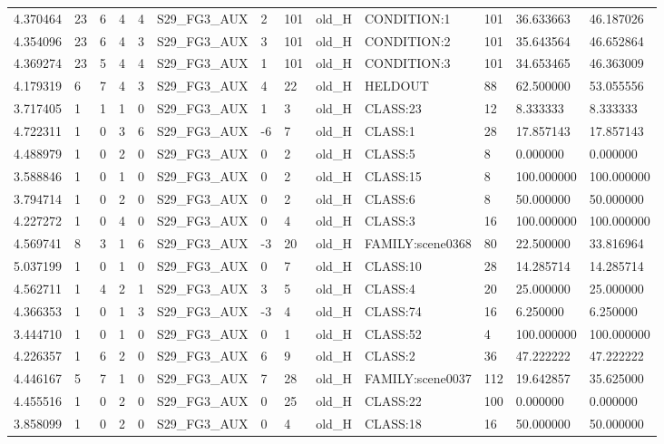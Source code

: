 \begin{tabular}{lllllllllllll}
4.370464 & 23 & 6 & 4 & 4 & S29\_FG3\_AUX & 2 & 101 & old\_H & CONDITION:1 & 101 & 36.633663 & 46.187026 \\
4.354096 & 23 & 6 & 4 & 3 & S29\_FG3\_AUX & 3 & 101 & old\_H & CONDITION:2 & 101 & 35.643564 & 46.652864 \\
4.369274 & 23 & 5 & 4 & 4 & S29\_FG3\_AUX & 1 & 101 & old\_H & CONDITION:3 & 101 & 34.653465 & 46.363009 \\
4.179319 & 6 & 7 & 4 & 3 & S29\_FG3\_AUX & 4 & 22 & old\_H & HELDOUT & 88 & 62.500000 & 53.055556 \\
3.717405 & 1 & 1 & 1 & 0 & S29\_FG3\_AUX & 1 & 3 & old\_H & CLASS:23 & 12 & 8.333333 & 8.333333 \\
4.722311 & 1 & 0 & 3 & 6 & S29\_FG3\_AUX & -6 & 7 & old\_H & CLASS:1 & 28 & 17.857143 & 17.857143 \\
4.488979 & 1 & 0 & 2 & 0 & S29\_FG3\_AUX & 0 & 2 & old\_H & CLASS:5 & 8 & 0.000000 & 0.000000 \\
3.588846 & 1 & 0 & 1 & 0 & S29\_FG3\_AUX & 0 & 2 & old\_H & CLASS:15 & 8 & 100.000000 & 100.000000 \\
3.794714 & 1 & 0 & 2 & 0 & S29\_FG3\_AUX & 0 & 2 & old\_H & CLASS:6 & 8 & 50.000000 & 50.000000 \\
4.227272 & 1 & 0 & 4 & 0 & S29\_FG3\_AUX & 0 & 4 & old\_H & CLASS:3 & 16 & 100.000000 & 100.000000 \\
4.569741 & 8 & 3 & 1 & 6 & S29\_FG3\_AUX & -3 & 20 & old\_H & FAMILY:scene0368 & 80 & 22.500000 & 33.816964 \\
5.037199 & 1 & 0 & 1 & 0 & S29\_FG3\_AUX & 0 & 7 & old\_H & CLASS:10 & 28 & 14.285714 & 14.285714 \\
4.562711 & 1 & 4 & 2 & 1 & S29\_FG3\_AUX & 3 & 5 & old\_H & CLASS:4 & 20 & 25.000000 & 25.000000 \\
4.366353 & 1 & 0 & 1 & 3 & S29\_FG3\_AUX & -3 & 4 & old\_H & CLASS:74 & 16 & 6.250000 & 6.250000 \\
3.444710 & 1 & 0 & 1 & 0 & S29\_FG3\_AUX & 0 & 1 & old\_H & CLASS:52 & 4 & 100.000000 & 100.000000 \\
4.226357 & 1 & 6 & 2 & 0 & S29\_FG3\_AUX & 6 & 9 & old\_H & CLASS:2 & 36 & 47.222222 & 47.222222 \\
4.446167 & 5 & 7 & 1 & 0 & S29\_FG3\_AUX & 7 & 28 & old\_H & FAMILY:scene0037 & 112 & 19.642857 & 35.625000 \\
4.455516 & 1 & 0 & 2 & 0 & S29\_FG3\_AUX & 0 & 25 & old\_H & CLASS:22 & 100 & 0.000000 & 0.000000 \\
3.858099 & 1 & 0 & 2 & 0 & S29\_FG3\_AUX & 0 & 4 & old\_H & CLASS:18 & 16 & 50.000000 & 50.000000 \\

\end{tabular}
